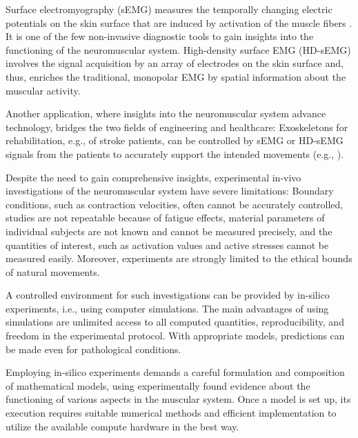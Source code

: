 Surface electromyography (sEMG) measures the temporally changing electric potentials on the skin surface that are induced by activation of the muscle fibers \cite{Merletti2004}. It is one of the few non-invasive diagnostic tools to gain insights into the functioning of the neuromuscular system.
High-density surface EMG (HD-sEMG) involves the signal acquisition by an array of electrodes on the skin surface and, thus, enriches the traditional, monopolar EMG by spatial information about the muscular activity. 

Another application, where insights into the neuromuscular system advance technology, bridges the two fields of engineering and healthcare: Exoskeletons for rehabilitation, e.g., of stroke patients, can be controlled by sEMG or HD-sEMG signals from the patients to accurately support the intended movements (e.g., \cite{Leonardis2015,Mulas2005,Andreasen2005}).

Despite the need to gain comprehensive insights, experimental in-vivo investigations of the neuromuscular system have severe limitations: Boundary conditions, such as contraction velocities, often cannot be accurately controlled, studies are not repeatable because of fatigue effects, material parameters of individual subjects are not known and cannot be measured precisely, and the quantities of interest, such as activation values and active stresses cannot be measured easily. Moreover, experiments are strongly limited to the ethical bounds of natural movements. 

A controlled environment for such investigations can be provided by in-silico experiments, i.e., using computer simulations. The main advantages of using simulations are unlimited access to all computed quantities, reproducibility, and freedom in the experimental protocol.
With appropriate models, predictions can be made even for pathological conditions.

Employing in-silico experiments demands a careful formulation and composition of mathematical models, using experimentally found evidence about the functioning of various aspects in the muscular system. Once a model is set up, its execution requires suitable numerical methods and efficient implementation to utilize the available compute hardware in the best way.


